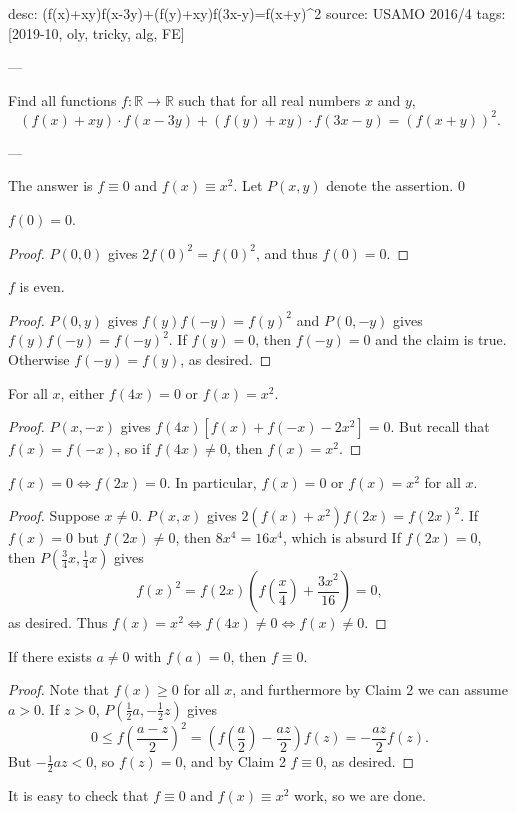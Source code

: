 desc: (f(x)+xy)f(x-3y)+(f(y)+xy)f(3x-y)=f(x+y)^2
source: USAMO 2016/4
tags: [2019-10, oly, tricky, alg, FE]

---

Find all functions $f:\mathbb R\to\mathbb R$ such that for all real numbers $x$ and $y$, \[(f(x)+xy)\cdot f(x-3y)+(f(y)+xy)\cdot f(3x-y)=(f(x+y))^2.\]

---

The answer is $f\equiv0$ and $f(x)\equiv x^2$.  Let $P(x,y)$ denote the assertion.
\setcounter{claim}0
\begin{claim}
    $f(0)=0$.
\end{claim}
\begin{proof}
    $P(0,0)$ gives $2f(0)^2=f(0)^2$, and thus $f(0)=0$.
\end{proof}
\begin{claim}
    $f$ is even.
\end{claim}
\begin{proof}
    $P(0,y)$ gives $f(y)f(-y)=f(y)^2$ and $P(0,-y)$ gives $f(y)f(-y)=f(-y)^2$. If $f(y)=0$, then $f(-y)=0$ and the claim is true. Otherwise $f(-y)=f(y)$, as desired.
\end{proof}
\begin{claim}
    For all $x$, either $f(4x)=0$ or $f(x)=x^2$.
\end{claim}
\begin{proof}
    $P(x,-x)$ gives $f(4x)\left[f(x)+f(-x)-2x^2\right]=0$. But recall that $f(x)=f(-x)$, so if $f(4x)\ne0$, then $f(x)=x^2$.
\end{proof}
\begin{claim}
    $f(x)=0\iff f(2x)=0$. In particular, $f(x)=0$ or $f(x)=x^2$ for all $x$.
\end{claim}
\begin{proof}
    Suppose $x\ne0$. $P(x,x)$ gives $2\left(f(x)+x^2\right)f(2x)=f(2x)^2$. If $f(x)=0$ but $f(2x)\ne0$, then $8x^4=16x^4$, which is absurd If $f(2x)=0$, then $P(\tfrac34x,\tfrac14x)$ gives \[f(x)^2=f(2x)\left(f\left(\frac x4\right)+\frac{3x^2}{16}\right)=0,\]
    as desired. Thus $f(x)=x^2\iff f(4x)\ne0\iff f(x)\ne0$.
\end{proof}
\begin{claim}
    If there exists $a\ne0$ with $f(a)=0$, then $f\equiv0$.
\end{claim}
\begin{proof}
    Note that $f(x)\ge0$ for all $x$, and furthermore by Claim 2 we can assume $a>0$. If $z>0$, $P(\tfrac12a,-\tfrac12z)$ gives \[0\le f\left(\frac{a-z}2\right)^2=\left(f\left(\frac a2\right)-\frac{az}2\right)f(z)=-\frac{az}2f(z).\]
    But $-\tfrac12az<0$, so $f(z)=0$, and by Claim 2 $f\equiv0$, as desired.
\end{proof}

It is easy to check that $f\equiv0$ and $f(x)\equiv x^2$ work, so we are done.
